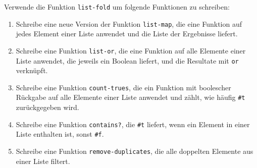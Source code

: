 \begin{aufgabe}
  Verwende die Funktion \lstinline{list-fold} um folgende 
  Funktionen zu schreiben:
  \begin{enumerate}
  \item Schreibe eine neue Version der Funktion \lstinline{list-map},
    die eine Funktion auf jedes Element einer Liste anwendet und die
    Liste der Ergebnisse liefert.
  \item Schreibe eine Funktion \lstinline{list-or}, die eine Funktion
    auf alle Elemente einer Liste anwendet, die jeweils ein Boolean
    liefert, und die Resultate mit \lstinline{or} verknüpft.
  \item Schreibe eine Funktion \lstinline{count-trues}, die ein
    Funktion mit boolescher Rückgabe auf
    alle Elemente einer Liste anwendet und zählt, wie häufig \lstinline{#t}
    zurückgegeben wird.
  \item Schreibe eine Funktion \lstinline{contains?}, die
    \lstinline{#t} liefert, wenn ein
    Element in einer Liste enthalten ist, sonst \lstinline{#f}.
  \item Schreibe eine Funktion \lstinline{remove-duplicates}, die alle doppelten
    Elemente aus einer Liste filtert.
  \end{enumerate}
\end{aufgabe}

